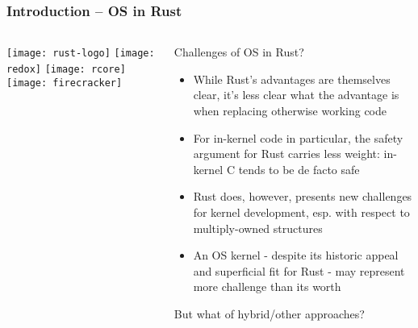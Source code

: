 \begin{frame}[plain]
	\frametitle{Introduction -- OS in Rust}
	
	
	
	\begin{columns}
		
		\begin{column}{.2\textwidth}
			
			\texttt{[image: rust-logo]}
			\texttt{[image: redox]}
			\texttt{[image: rcore]}
			\texttt{[image: firecracker]}
		\end{column}
		
		\begin{column}{.8\textwidth}
			
			Challenges of OS in Rust? 
			
			\begin{itemize}
				
				\item While Rust’s advantages are themselves clear, it’s less clear
				what the advantage is when replacing otherwise working code
				
				\item   For in-kernel code in particular, the safety argument for Rust carries less weight: in-kernel C tends to be de facto safe

				\item Rust does, however, presents new challenges for kernel
				development, esp. with respect to multiply-owned structures

				\item An OS kernel - despite its historic appeal and superficial fit for	Rust - may represent more challenge than its worth
				
				
			\end{itemize}
			But what of hybrid/other approaches?
			
		\end{column}
		
		
	\end{columns}
	
	
\end{frame}


